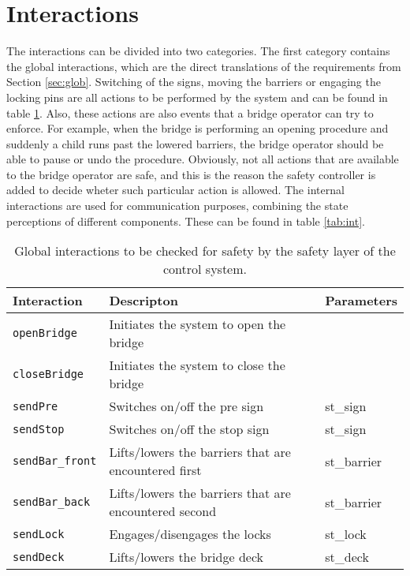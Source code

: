 \section{Interactions}
\label{sec:act}


The interactions can be divided into two categories. The first category contains the global interactions, which are the direct translations of the requirements from Section \ref{sec:glob}.
Switching of the signs, moving the barriers or engaging the locking pins are all actions to be performed by the system and can be found in table \ref{tab:glob}. Also, these actions are also events that a bridge operator can try to enforce. For example, when the bridge is performing an opening procedure and suddenly a child runs past the lowered barriers, the bridge operator should be able to pause or undo the procedure. Obviously, not all actions that are available to the bridge operator are safe, and this is the reason the safety controller is added to decide wheter such particular action is allowed.
The internal interactions are used for communication purposes, combining the state perceptions of different components. These can be found in table \ref{tab:int}.
%
\begin{table}[htb]%
\begin{tabular}{lll}
      \textbf{Interaction} &	\textbf{Descripton}	&	\textbf{Parameters}\\
      \hline
      \texttt{openBridge} & Initiates the system to open the bridge &\\
      \texttt{closeBridge} & Initiates the system to close the bridge & \\
      \texttt{sendPre} & Switches on/off the pre sign & st\_sign\\
      \texttt{sendStop} & Switches on/off the stop sign & st\_sign\\
      \texttt{sendBar\_front} & Lifts/lowers the barriers that are encountered first & st\_barrier\\
			\texttt{sendBar\_back} & Lifts/lowers the barriers that are encountered second & st\_barrier\\
      \texttt{sendLock} & Engages/disengages the locks & st\_lock\\
      \texttt{sendDeck} & Lifts/lowers the bridge deck & st\_deck\\
\end{tabular}
\caption{Global interactions to be checked for safety by the safety layer of the control system.}
\label{tab:glob}
\end{table}
